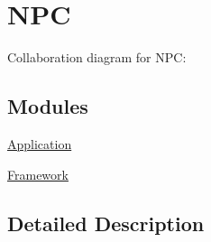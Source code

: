 \hypertarget{group___n_p_c}{}\section{N\+PC}
\label{group___n_p_c}
Collaboration diagram for N\+PC\+:
\subsection*{Modules}
\begin{DoxyCompactItemize}
\item 
\hyperlink{group___application}{Application}
\item 
\hyperlink{group___framework}{Framework}
\end{DoxyCompactItemize}


\subsection{Detailed Description}
